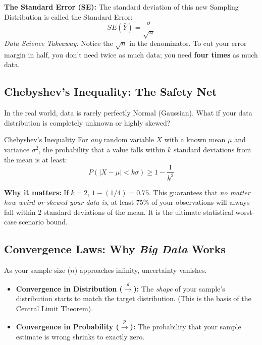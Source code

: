 \documentclass[11pt]{article}
\theoremstyle{smallexample}
\begin{document}
\textbf{The Standard Error (SE):} 
The standard deviation of this new Sampling Distribution is called the Standard Error:
\begin{equation}
    SE(\bar{Y}) = \frac{\sigma}{\sqrt{n}}
\end{equation}
\textit{Data Science Takeaway:} Notice the $\sqrt{n}$ in the denominator. To cut your error margin in half, you don't need twice as much data; you need \textbf{four times} as much data.

\subsection{Chebyshev's Inequality: The Safety Net}
In the real world, data is rarely perfectly Normal (Gaussian). What if your data distribution is completely unknown or highly skewed?

\begin{defbox}{Chebyshev's Inequality}
For \textit{any} random variable $X$ with a known mean $\mu$ and variance $\sigma^2$, the probability that a value falls within $k$ standard deviations from the mean is at least:
\begin{equation}
    P(|X - \mu| < k\sigma) \geq 1 - \frac{1}{k^2}
\end{equation}
\end{defbox}

\textbf{Why it matters:} If $k=2$, $1 - (1/4) = 0.75$. This guarantees that \textit{no matter how weird or skewed your data is}, at least 75\% of your observations will always fall within 2 standard deviations of the mean. It is the ultimate statistical worst-case scenario bound.

\subsection{Convergence Laws: Why \textit{Big Data} Works}
As your sample size ($n$) approaches infinity, uncertainty vanishes.

\begin{itemize}
    \item \textbf{Convergence in Distribution ($\xrightarrow{d}$):} The \textit{shape} of your sample's distribution starts to match the target distribution. (This is the basis of the Central Limit Theorem).
    \item \textbf{Convergence in Probability ($\xrightarrow{p}$):} The probability that your sample estimate is wrong shrinks to exactly zero.
\end{itemize}
\end{document}

